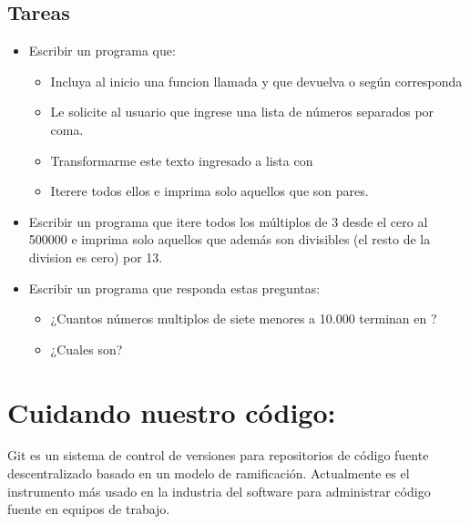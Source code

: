 \documentclass[a5paper,9pt,spanish]{sphinxmanual}
\begin{document}
\section{Tareas}
\label{\detokenize{for:tareas}}\begin{itemize}
\item {} 
\sphinxAtStartPar
Escribir un programa que:
\begin{itemize}
\item {} 
\sphinxAtStartPar
Incluya al inicio una funcion llamada  y que devuelva
 o  según corresponda

\item {} 
\sphinxAtStartPar
Le solicite al usuario que ingrese una lista de números separados por coma.

\item {} 
\sphinxAtStartPar
Transformarme este texto ingresado a lista con 

\item {} 
\sphinxAtStartPar
Iterere todos ellos e imprima solo aquellos que son pares.

\end{itemize}

\item {} 
\sphinxAtStartPar
Escribir un programa que itere todos los múltiplos de 3 desde el cero
al 500000 e imprima solo aquellos que además son divisibles (el resto
de la division es cero) por 13.

\item {} 
\sphinxAtStartPar
Escribir un programa que responda estas preguntas:
\begin{itemize}
\item {} 
\sphinxAtStartPar
¿Cuantos números multiplos de siete menores a 10.000 terminan en ?

\item {} 
\sphinxAtStartPar
¿Cuales son?

\end{itemize}

\end{itemize}

\sphinxstepscope


\chapter{Cuidando nuestro código: }
\label{\detokenize{git:cuidando-nuestro-codigo-git}}\label{\detokenize{git::doc}}
\sphinxAtStartPar
Git es un sistema de control de versiones para repositorios de código fuente
descentralizado basado en un modelo de ramificación.
Actualmente es el instrumento más usado en la industria del software para
administrar código fuente en equipos de trabajo.
\end{document}
